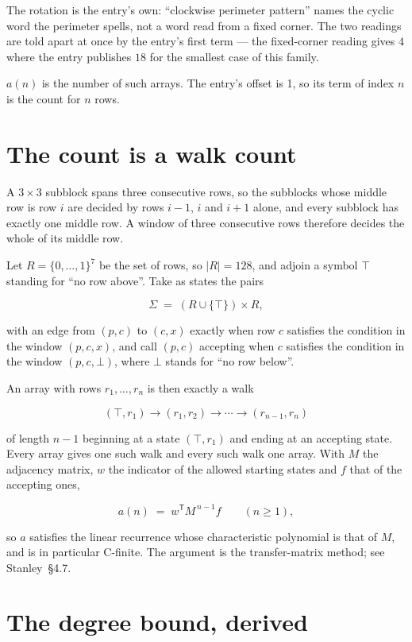 \documentclass[11pt]{article}
\theoremstyle{definition}
\begin{document}
The rotation is the entry's own: ``clockwise perimeter pattern'' names the cyclic word the perimeter spells, not a word read from a fixed corner. The two readings are told apart at once by the entry's first term --- the fixed-corner reading gives $4$ where the entry publishes $18$ for the smallest case of this family.

$a(n)$ is the number of such arrays. The entry's offset is 1, so its term of index $n$ is the count for $n$ rows.

\section{The count is a walk count}

A $3 \times 3$ subblock spans three consecutive rows, so the subblocks whose middle row is row $i$ are decided by rows $i-1$, $i$ and $i+1$ alone, and every subblock has exactly one middle row. A window of three consecutive rows therefore decides the whole of its middle row.

Let $R = \{0,\dots,1\}^{7}$ be the set of rows, so $|R| = 128$, and adjoin a symbol $\top$ standing for ``no row above''. Take as states the pairs

\[\Sigma \;=\; (R \cup \{\top\}) \times R,\]

with an edge from $(p,c)$ to $(c,x)$ exactly when row $c$ satisfies the condition in the window $(p,c,x)$, and call $(p,c)$ accepting when $c$ satisfies the condition in the window $(p,c,\bot)$, where $\bot$ stands for ``no row below''.

An array with rows $r_1,\dots,r_n$ is then exactly a walk

\[(\top,r_1) \to (r_1,r_2) \to \cdots \to (r_{n-1},r_n)\]

of length $n-1$ beginning at a state $(\top,r_1)$ and ending at an accepting state. Every array gives one such walk and every such walk one array. With $M$ the adjacency matrix, $w$ the indicator of the allowed starting states and $f$ that of the accepting ones,

\[a(n) \;=\; w^{\mathsf T} M^{\,n-1} f \qquad (n \ge 1),\]

so $a$ satisfies the linear recurrence whose characteristic polynomial is that of $M$, and is in particular C-finite. The argument is the transfer-matrix method; see Stanley~\S4.7.

\section{The degree bound, derived}
\end{document}
